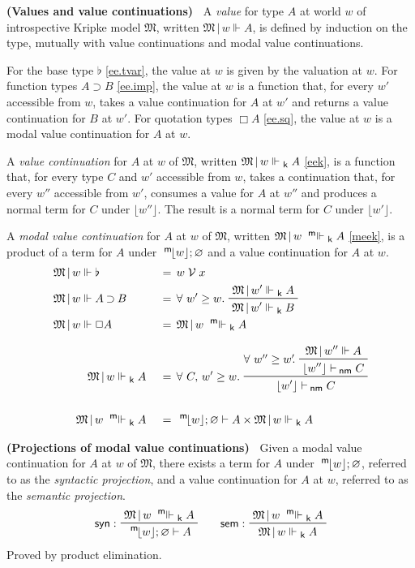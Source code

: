 \documentclass{entcs}
\numberwithin{equation}{thm}
\newcommand{\tsf}[1]{\textsf{\upshape{#1}}}
\newcommand{\stsf}[1]{\tsf{\small{#1}}}
\renewcommand{\:}{\mathrel{:}}
\newcommand{\tyrule}[1]{\prftree[l]{${#1} \:\,$}}
\let\oldforall\forall
\renewcommand{\forall}{\oldforall\,}
\newcommand{\0}{\varnothing}
\newcommand{\base}{\flat}
\newcommand{\imp}{\mathbin{\supset}}
\newcommand{\sq}{\Box}
\renewcommand{\e}{\mathrel{\vdash}}
\newcommand{\enm}{\mathrel{\vdash_{\mkern-2mu\stsf{nm}}}}
\newcommand{\M}{\mathfrak{M}}
\newcommand{\V}{\mathrel{\mathcal{V}}}
\newcommand{\peek}[1]{\mathopen{\lfloor}{#1}\mathclose{\rfloor}}
\newcommand{\mpeek}[1]{\mathopen{^{\stsf{m}\mkern-3mu}\lfloor}{#1}\mathclose{\rfloor}}
\newcommand{\ee}{\mathrel{\Vdash}}
\newcommand{\eek}{\mathrel{\Vdash_{\stsf{k}}}}
\newcommand{\meek}{\mathrel{^{\stsf{m}\mkern-6mu}\Vdash_{\stsf{k}}}}
\newcommand{\syn}{\operatorname{\tsf{syn}}}
\newcommand{\sem}{\operatorname{\tsf{sem}}}
\begin{document}
\begin{definition}
  \textbf{(Values and value continuations)\ }
  \label{ee/eek/meek}
  A \emph{value} for type $A$ at world $w$ of introspective Kripke model $\M$, written $\M\,|\,w \ee A$, is defined by induction on the type, mutually with value continuations and modal value continuations.
  
  For the base type $\flat$ \eqref{ee.tvar}, the value at $w$ is given by the valuation at $w$.
  For function types $A \imp B$ \eqref{ee.imp}, the value at $w$ is a function that, for every $w'$ accessible from $w$, takes a value continuation for $A$ at $w'$ and returns a value continuation for $B$ at $w'$.
  For quotation types $\sq A$ \eqref{ee.sq}, the value at $w$ is a modal value continuation for $A$ at $w$.
  
  A \emph{value continuation} for $A$ at $w$ of $\M$, written $\M\,|\,w \eek A$ \eqref{eek}, is a function that, for every type $C$ and $w'$ accessible from $w$, takes a continuation that, for every $w''$ accessible from $w'$, consumes a value for $A$ at $w''$ and produces a normal term for $C$ under $\peek{w''}$.  The result is a normal term for $C$ under $\peek{w'}$.
  
   A \emph{modal value continuation} for $A$ at $w$ of $\M$, written $\M\,|\,w \meek A$ \eqref{meek}, is a product of a term for $A$ under $\mpeek{w}; \0$ and a value continuation for $A$ at $w$.
  \begin{alignat}{3}
    \label{ee.tvar} & \rlap{$\M\,|\,w \ee \base$}    &&\,&&=\, w \V x\\
    \label{ee.imp}  & \rlap{$\M\,|\,w \ee A \imp B$} &&\,&&=\, \forall w' \ge w.\ \raisebox{-8pt}{\prftree{\M\,|\,w' \eek A} {\M\,|\,w' \eek B}}\\
    \label{ee.sq}   & \rlap{$\M\,|\,w \ee \sq A$}    &&\,&&=\, \M\,|\,w \meek A\\[0.5\baselineskip]
    \label{eek}     && \quad \M\,|\,w \eek A         &\,&&=\, \forall C,\,w' \ge w.\ \raisebox{-8pt}{\prftree{\raisebox{8pt}{$\forall w'' \ge w'\mkern-4mu.\ $} \prftree{\M\,|\,w'' \ee A}{\lfloor w'' \rfloor \enm C}}{\lfloor w' \rfloor \enm C}}\\[\baselineskip]
    \label{meek}    && \quad \M\,|\,w \meek A        &\,&&=\, \mpeek{w}; \0 \e A \times \M\,|\,w \eek A
  \end{alignat}
\end{definition}

\begin{lemma}
  \normalshape
  \textbf{(Projections of modal value continuations)\ }
  \label{syn/sem}
  Given a modal value continuation for $A$ at $w$ of $\M$, there exists a term for $A$ under $\mpeek{w}; \0$, referred to as the \emph{syntactic projection}, and a value continuation for $A$ at $w$, referred to as the \emph{semantic projection}.
  \begin{gather*}
    \tyrule{\syn}{\M\,|\, w \meek A}{\mpeek{w}; \0 \e A}\qquad
    \tyrule{\sem}{\M\,|\, w \meek A}{\M\,|\, w \eek A}
  \end{gather*}
  Proved by product elimination.
\end{lemma}
\end{document}
